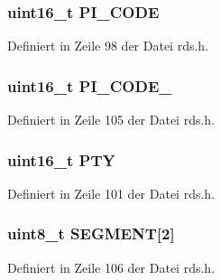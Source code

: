 \subsubsection[{P\+I\+\_\+\+C\+O\+D\+E}]{\setlength{\rightskip}{0pt plus 5cm}uint16\+\_\+t P\+I\+\_\+\+C\+O\+D\+E}\label{structgroup__2b_a5cd9b1f6413028425796c1129aa8fd87}


Definiert in Zeile 98 der Datei rds.\+h.

\hypertarget{structgroup__2b_ae86fed9d07832a5c3cc36d5aaa064bcb}{}
\subsubsection[{P\+I\+\_\+\+C\+O\+D\+E\+\_\+2}]{\setlength{\rightskip}{0pt plus 5cm}uint16\+\_\+t P\+I\+\_\+\+C\+O\+D\+E\+\_}\label{structgroup__2b_ae86fed9d07832a5c3cc36d5aaa064bcb}


Definiert in Zeile 105 der Datei rds.\+h.

\hypertarget{structgroup__2b_a0474967478fbbc2c71b800d2e0132d45}{}
\subsubsection[{P\+T\+Y}]{\setlength{\rightskip}{0pt plus 5cm}uint16\+\_\+t P\+T\+Y}\label{structgroup__2b_a0474967478fbbc2c71b800d2e0132d45}


Definiert in Zeile 101 der Datei rds.\+h.

\hypertarget{structgroup__2b_ad4b043906241d98e6b480a31f1438352}{}
\subsubsection[{S\+E\+G\+M\+E\+N\+T}]{\setlength{\rightskip}{0pt plus 5cm}uint8\+\_\+t S\+E\+G\+M\+E\+N\+T\mbox{[}2\mbox{]}}\label{structgroup__2b_ad4b043906241d98e6b480a31f1438352}


Definiert in Zeile 106 der Datei rds.\+h.

\hypertarget{structgroup__2b_ab9e634c63b0d95a96716d5f6d7f06d72}{}
